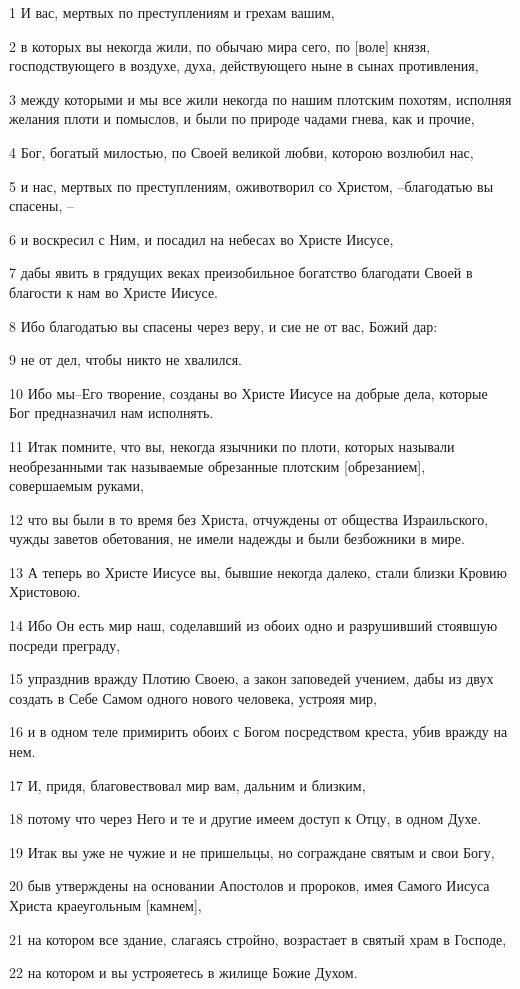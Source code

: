 \par 1 И вас, мертвых по преступлениям и грехам вашим,
\par 2 в которых вы некогда жили, по обычаю мира сего, по [воле] князя, господствующего в воздухе, духа, действующего ныне в сынах противления,
\par 3 между которыми и мы все жили некогда по нашим плотским похотям, исполняя желания плоти и помыслов, и были по природе чадами гнева, как и прочие,
\par 4 Бог, богатый милостью, по Своей великой любви, которою возлюбил нас,
\par 5 и нас, мертвых по преступлениям, оживотворил со Христом, --благодатью вы спасены, --
\par 6 и воскресил с Ним, и посадил на небесах во Христе Иисусе,
\par 7 дабы явить в грядущих веках преизобильное богатство благодати Своей в благости к нам во Христе Иисусе.
\par 8 Ибо благодатью вы спасены через веру, и сие не от вас, Божий дар:
\par 9 не от дел, чтобы никто не хвалился.
\par 10 Ибо мы--Его творение, созданы во Христе Иисусе на добрые дела, которые Бог предназначил нам исполнять.
\par 11 Итак помните, что вы, некогда язычники по плоти, которых называли необрезанными так называемые обрезанные плотским [обрезанием], совершаемым руками,
\par 12 что вы были в то время без Христа, отчуждены от общества Израильского, чужды заветов обетования, не имели надежды и были безбожники в мире.
\par 13 А теперь во Христе Иисусе вы, бывшие некогда далеко, стали близки Кровию Христовою.
\par 14 Ибо Он есть мир наш, соделавший из обоих одно и разрушивший стоявшую посреди преграду,
\par 15 упразднив вражду Плотию Своею, а закон заповедей учением, дабы из двух создать в Себе Самом одного нового человека, устрояя мир,
\par 16 и в одном теле примирить обоих с Богом посредством креста, убив вражду на нем.
\par 17 И, придя, благовествовал мир вам, дальним и близким,
\par 18 потому что через Него и те и другие имеем доступ к Отцу, в одном Духе.
\par 19 Итак вы уже не чужие и не пришельцы, но сограждане святым и свои Богу,
\par 20 быв утверждены на основании Апостолов и пророков, имея Самого Иисуса Христа краеугольным [камнем],
\par 21 на котором все здание, слагаясь стройно, возрастает в святый храм в Господе,
\par 22 на котором и вы устрояетесь в жилище Божие Духом.

